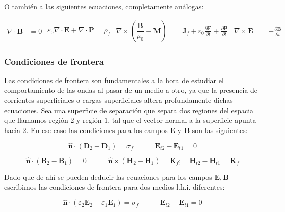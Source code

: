 \documentclass[12pt]{article}
\newcommand{\parentesis}[1]{\left( #1  \right)}
\newcommand{\parciales}[2]{\frac{\partial #1}{\partial #2}}
\newcommand{\tquad}{\quad \quad \quad}
\newcommand{\rota}{\nabla \times}
\newcommand{\dive}{\nabla \cdot}
\newcommand{\Bn}{\mathbf{B}}
\newcommand{\En}{\mathbf{E}}
\newcommand{\Dn}{\mathbf{D}}
\newcommand{\Hn}{\mathbf{H}}
\newcommand{\Jn}{\mathbf{J}}
\newcommand{\Kn}{\mathbf{K}}
\newcommand{\Pn}{\mathbf{P}}
\newcommand{\Mn}{\mathbf{M}}
\newcommand{\hnn}{\hat{\mathbf{n}}}
\numberwithin{equation}{section}
\numberwithin{figure}{section}
\begin{document}
O también a las siguientes ecuaciones, completamente análogas:



\begin{subequations}\label{Ec:5.1.8.Maxwell}
\begin{align}
\dive \Bn & = 0 \label{Ec:5.1.8.a.DivB}
\end{align}
\begin{align}
 \varepsilon_0 \dive \En + \dive \Pn = \rho_f \label{Ec:5.1.8.b.DivE}
\end{align}
\begin{align}
\rota \parentesis{\dfrac{\Bn}{\mu_0}-\Mn}  & =  \Jn_f + \varepsilon_0 \parciales{\En}{t} + \parciales{\Pn}{t} \label{Ec:5.1.8.c.RotB} 
\end{align}
\begin{align}
\rota \En  & = -  \parciales{\Bn}{t} \label{Ec:5.1.8.d.RotE}
\end{align}
\end{subequations}

\subsubsection{Condiciones de frontera} \label{Subsub:5.1.4}

Las condiciones de frontera son fundamentales a la hora de estudiar el comportamiento de las ondas al pasar de un medio a otro, ya que la presencia de corrientes superficiales o cargas superficiales altera profundamente dichas ecuaciones. Sea una superficie de separación que separa dos regiones del espacia que llamamos región $2$ y región $1$, tal que el vector normal a la superficie apunta hacia 2. En ese caso las condiciones para los campos $\En$ y $\Bn$ son las siguientes:


\begin{equation}
\hnn \cdot (\Dn_2 - \Dn_1) = \sigma_f \tquad \En_{t2}-\En_{t1}=0
\end{equation}

\begin{equation}
\hnn \cdot (\Bn_2-\Bn_1)=0  \tquad \hnn \times (\Hn_2 - \Hn_1) = \Kn_f; \quad \Hn_{t2} - \Hn_{t1} = \Kn_f 
\end{equation}

Dado que de ahí se pueden deducir las ecuaciones para los campos $\En,\Bn$ escribimos las condiciones de frontera para dos medios l.h.i. diferentes:


\begin{equation}
\hnn \cdot (\varepsilon_2 \En_2 - \varepsilon_1 \En_1) = \sigma_f \tquad \En_{t2}-\En_{t1}=0
\end{equation}
\end{document}
